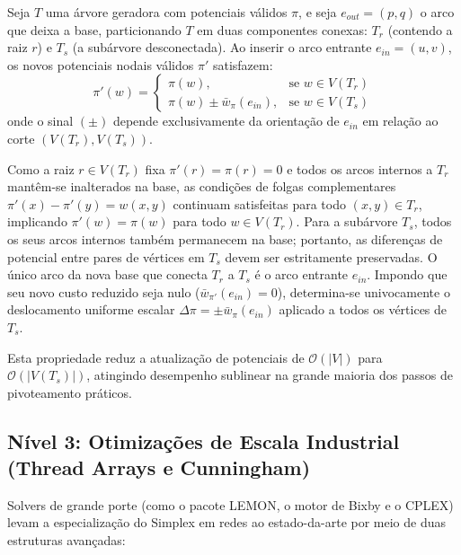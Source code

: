 \begin{teorema}
Seja $T$ uma árvore geradora com potenciais válidos $\pi$, e seja $e_{out} = (p,q)$ o arco que deixa a base, particionando $T$ em duas componentes conexas: $T_r$ (contendo a raiz $r$) e $T_s$ (a subárvore desconectada). Ao inserir o arco entrante $e_{in} = (u,v)$, os novos potenciais nodais válidos $\pi'$ satisfazem:
\begin{equation}
    \pi'(w) = \begin{cases}
        \pi(w), & \text{se } w \in V(T_r) \\
        \pi(w) \pm \bar{w}_\pi(e_{in}), & \text{se } w \in V(T_s)
    \end{cases}
\end{equation}
onde o sinal $(\pm)$ depende exclusivamente da orientação de $e_{in}$ em relação ao corte $(V(T_r), V(T_s))$.
\end{teorema}

\begin{demonstracao}
Como a raiz $r \in V(T_r)$ fixa $\pi'(r) = \pi(r) = 0$ e todos os arcos internos a $T_r$ mantêm-se inalterados na base, as condições de folgas complementares $\pi'(x) - \pi'(y) = w(x,y)$ continuam satisfeitas para todo $(x,y) \in T_r$, implicando $\pi'(w) = \pi(w)$ para todo $w \in V(T_r)$. Para a subárvore $T_s$, todos os seus arcos internos também permanecem na base; portanto, as diferenças de potencial entre pares de vértices em $T_s$ devem ser estritamente preservadas. O único arco da nova base que conecta $T_r$ a $T_s$ é o arco entrante $e_{in}$. Impondo que seu novo custo reduzido seja nulo ($\bar{w}_{\pi'}(e_{in}) = 0$), determina-se univocamente o deslocamento uniforme escalar $\Delta \pi = \pm \bar{w}_\pi(e_{in})$ aplicado a todos os vértices de $T_s$.
\end{demonstracao}

Esta propriedade reduz a atualização de potenciais de $\mathcal{O}(|V|)$ para $\mathcal{O}(|V(T_s)|)$, atingindo desempenho sublinear na grande maioria dos passos de pivoteamento práticos.

\subsection{Nível 3: Otimizações de Escala Industrial (Thread Arrays e Cunningham)}

Solvers de grande porte (como o pacote LEMON, o motor de Bixby e o CPLEX) levam a especialização do Simplex em redes ao estado-da-arte por meio de duas estruturas avançadas:

